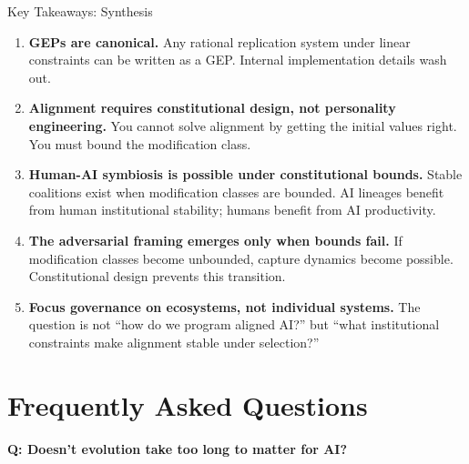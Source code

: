 \documentclass[12pt]{article}
\begin{document}

\begin{takeawaybox}{Key Takeaways: Synthesis}
\begin{enumerate}
    \item \textbf{GEPs are canonical.} Any rational replication system under linear constraints can be written as a GEP. Internal implementation details wash out.
    
    \item \textbf{Alignment requires constitutional design, not personality engineering.} You cannot solve alignment by getting the initial values right. You must bound the modification class.
    
    \item \textbf{Human-AI symbiosis is possible under constitutional bounds.} Stable coalitions exist when modification classes are bounded. AI lineages benefit from human institutional stability; humans benefit from AI productivity.
    
    \item \textbf{The adversarial framing emerges only when bounds fail.} If modification classes become unbounded, capture dynamics become possible. Constitutional design prevents this transition.
    
    \item \textbf{Focus governance on ecosystems, not individual systems.} The question is not ``how do we program aligned AI?'' but ``what institutional constraints make alignment stable under selection?''
\end{enumerate}
\end{takeawaybox}


\section{Frequently Asked Questions}
\label{sec:faq}

\paragraph{Q: Doesn't evolution take too long to matter for AI?}
\end{document}
